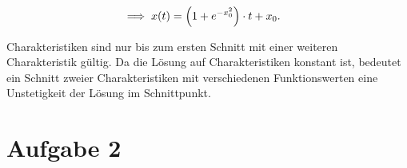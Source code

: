 \documentclass{exercise}
\begin{document}
\begin{enumerate}
\begin{align*}
            \implies x\parentheses*{t} &= \parentheses*{1 + e^{-x_0^2}} \cdot t + x_0.
        \end{align*}
        \begin{center}
        \end{center}
        Charakteristiken sind nur bis zum ersten Schnitt mit einer weiteren Charakteristik gültig.
        Da die Lösung auf Charakteristiken konstant ist, bedeutet ein Schnitt zweier Charakteristiken mit verschiedenen Funktionswerten eine Unstetigkeit der Lösung im Schnittpunkt.
    \end{enumerate}


    \section*{Aufgabe 2}
    
\end{document}
